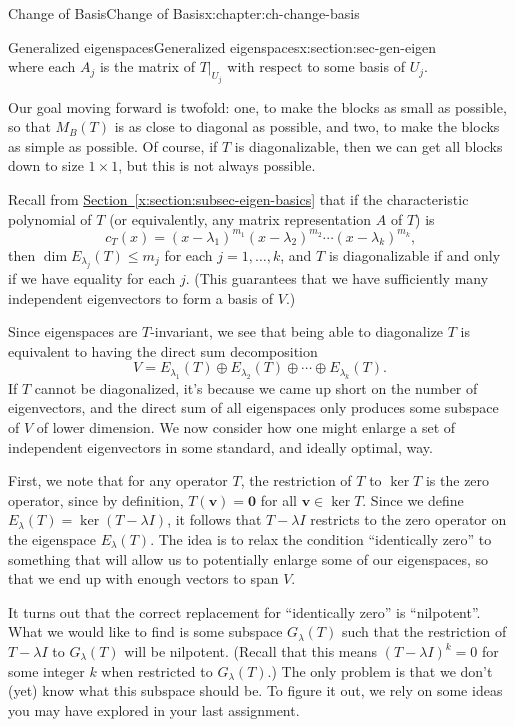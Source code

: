 \documentclass[oneside,10pt,]{book}
\newcommand{\xreffont}{\relax}
\numberwithin{equation}{section}
\newcommand{\vv}{\mathbf{v}}
\newcommand{\zer}{\mathbf{0}}
\begin{document}
\begin{chapterptx}{Change of Basis}{}{Change of Basis}{}{}{x:chapter:ch-change-basis}
\begin{sectionptx}{Generalized eigenspaces}{}{Generalized eigenspaces}{}{}{x:section:sec-gen-eigen}
\begin{equation*}
\end{equation*}
where each \(A_j\) is the matrix of \(T|_{U_j}\) with respect to some basis of \(U_j\).%
\par
Our goal moving forward is twofold: one, to make the blocks as small as possible, so that \(M_B(T)\) is as close to diagonal as possible, and two, to make the blocks as simple as possible. Of course, if \(T\) is diagonalizable, then we can get all blocks down to size \(1\times 1\), but this is not always possible.%
\par
Recall from \hyperref[x:section:subsec-eigen-basics]{Section~{\xreffont\ref{x:section:subsec-eigen-basics}}} that if the characteristic polynomial of \(T\) (or equivalently, any matrix representation \(A\) of \(T\)) is%
\begin{equation*}
c_T(x) = (x-\lambda_1)^{m_1}(x-\lambda_2)^{m_2}\cdots (x-\lambda_k)^{m_k}\text{,}
\end{equation*}
then \(\dim E_{\lambda_j}(T)\leq m_j\) for each \(j=1,\ldots, k\), and \(T\) is diagonalizable if and only if we have equality for each \(j\). (This guarantees that we have sufficiently many independent eigenvectors to form a basis of \(V\).)%
\par
Since eigenspaces are \(T\)-invariant, we see that being able to diagonalize \(T\) is equivalent to having the direct sum decomposition%
\begin{equation*}
V = E_{\lambda_1}(T)\oplus E_{\lambda_2}(T)\oplus \cdots \oplus E_{\lambda_k}(T)\text{.}
\end{equation*}
If \(T\) cannot be diagonalized, it's because we came up short on the number of eigenvectors, and the direct sum of all eigenspaces only produces some subspace of \(V\) of lower dimension. We now consider how one might enlarge a set of independent eigenvectors in some standard, and ideally optimal, way.%
\par
First, we note that for any operator \(T\), the restriction of \(T\) to \(\ker T\) is the zero operator, since by definition, \(T(\vv)=\zer\) for all \(\vv\in\ker T\). Since we define \(E_{\lambda}(T)=\ker (T-\lambda I)\), it follows that \(T-\lambda I\) restricts to the zero operator on the eigenspace \(E_\lambda(T)\). The idea is to relax the condition ``identically zero'' to something that will allow us to potentially enlarge some of our eigenspaces, so that we end up with enough vectors to span \(V\).%
\par
It turns out that the correct replacement for ``identically zero'' is ``nilpotent''. What we would like to find is some subspace \(G_\lambda(T)\) such that the restriction of \(T-\lambda I\) to \(G_\lambda(T)\) will be nilpotent. (Recall that this means \((T-\lambda I)^k = 0\) for some integer \(k\) when restricted to \(G_\lambda(T)\).) The only problem is that we don't (yet) know what this subspace should be. To figure it out, we rely on some ideas you may have explored in your last assignment.%

\end{sectionptx}
\end{chapterptx}
\end{document}
